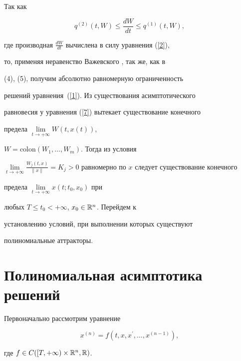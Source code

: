 \begin{pf}


Так как


$$


q^{(2)}(t,W) \leq \frac{dW}{dt} \leq q^{(1)}(t,W),


$$


где производная $\frac{dW}{dt}$ вычислена в силу уравнения (\ref{2}),


то, применяя неравенство Важевского \cite{11}, так же, как в


(4), (5), получим абсолютно равномерную ограниченность


решений уравнения~(\ref{1}). Из существования асимптотического


равновесия у уравнения (\ref{7}) вытекает существование конечного


предела $\lim\limits_{t\rightarrow +\infty}W(t,x(t))$,


$W=\mathrm{colon}(W_{1},\dotsc,W_{m})$. Тогда из условия


$\lim\limits_{t\rightarrow +\infty}\frac {W_{j}(t,x)}


{\|x\|}=K_{j}>0$ равномерно по $x$ следует существование конечного


предела $\lim\limits_{t\rightarrow +\infty} x(t;t_{0},x_{0})$ при


любых $T\leq t_{0}< +\infty$, $x_{0} \in {\Bbb R}^{n}$. Перейдем к


установлению условий, при выполнении которых существуют


полиномиальные аттракторы.


\end{pf}





\section{Полиномиальная асимптотика решений}





Первоначально рассмотрим уравнение


\begin{equation}\label{8}


x^{(n)}=f(t,x,x^{\prime},\dotsc,x^{(n-1)}),


\end{equation}


где $f \in C([T,+\infty)\times {\Bbb R}^{n},{\Bbb R})$.





